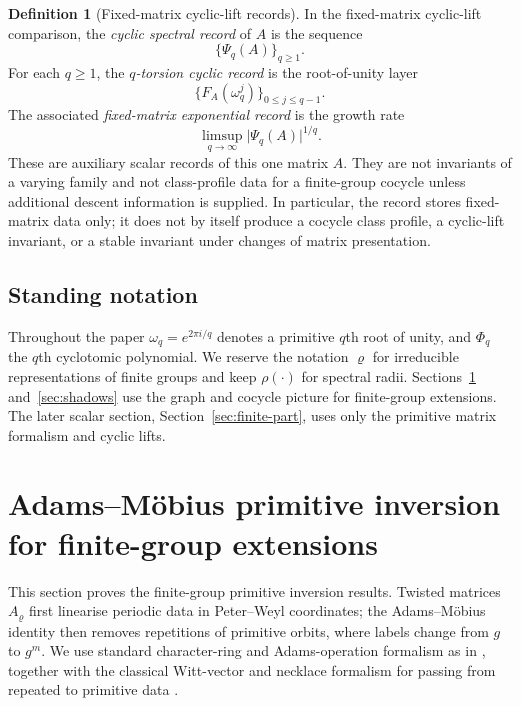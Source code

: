 \documentclass[11pt,a4paper]{amsart}
\theoremstyle{plain}
\theoremstyle{definition}
\newtheorem{definition}[theorem]{Definition}
\theoremstyle{remark}
\newcommand{\abs}[1]{\lvert #1 \rvert}
\begin{document}
\begin{definition}[Fixed-matrix cyclic-lift records]
  \label{def:spectral-fingerprints}
  In the fixed-matrix cyclic-lift comparison, the
  \emph{cyclic spectral record} of \(A\) is the sequence
  \[
    \{\Psi_q(A)\}_{q\ge 1}.
  \]
  For each \(q\ge 1\), the \emph{\(q\)-torsion cyclic record} is the
  root-of-unity layer
  \[
    \{F_A(\omega_q^j)\}_{0\le j\le q-1}.
  \]
  The associated \emph{fixed-matrix exponential record} is the growth rate
  \[
    \limsup_{q\to\infty}\abs{\Psi_q(A)}^{1/q}.
  \]
  These are auxiliary scalar records of this one matrix \(A\). They are
  not invariants of a varying family and not class-profile data for a
  finite-group cocycle unless additional descent information is supplied. In
  particular, the record stores fixed-matrix data only; it does not by
  itself produce a cocycle class profile, a cyclic-lift invariant, or a
  stable invariant under changes of matrix presentation.
\end{definition}

\subsection{Standing notation}

Throughout the paper \(\omega_q=e^{2\pi i/q}\) denotes a primitive
\(q\)th root of unity, and \(\Phi_q\) the \(q\)th cyclotomic
polynomial. We reserve the notation \(\varrho\) for irreducible
representations of finite groups and keep \(\rho(\cdot)\) for spectral
radii. Sections~\ref{sec:chebotarev} and~\ref{sec:shadows} use the
graph and cocycle picture for finite-group extensions. The later scalar
section, Section~\ref{sec:finite-part}, uses only the primitive matrix
formalism and cyclic lifts.


\section{Adams--M\"obius primitive inversion for finite-group extensions}
\label{sec:chebotarev}

This section proves the finite-group primitive inversion results. Twisted matrices
\(A_\varrho\) first linearise periodic data in Peter--Weyl coordinates;
the Adams--M\"obius identity then removes repetitions of primitive
orbits, where labels change from \(g\) to \(g^m\). We use standard
character-ring and Adams-operation formalism as in
\cite{AtiyahTall1969GroupRepresentationsLambdaRings,Serre1977LinearRepresentations,Knutson1973LambdaRings}, together with
the classical Witt-vector and necklace formalism for passing from
repeated to primitive data
\cite{DressSiebeneicher1988BurnsideRing,MetropolisRota1983Necklaces,Wehrhahn1990AperiodicRings}.
\end{document}
